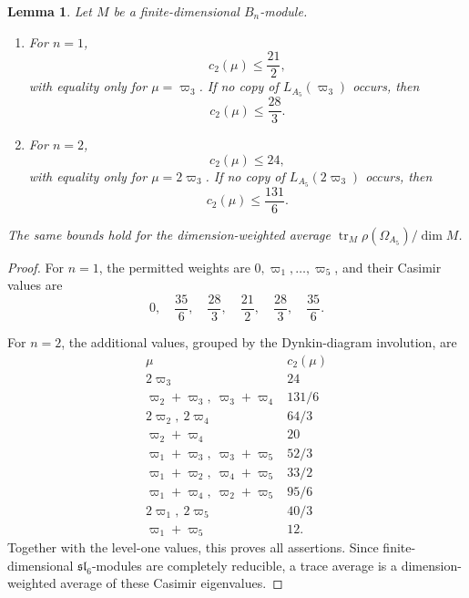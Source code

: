 \documentclass[11pt,reqno]{amsart}
\newtheorem{lemma}[theorem]{Lemma}
\theoremstyle{definition}
\theoremstyle{remark}
\begin{document}
\begin{lemma}\label{e6:lem:A5-Casimir-bounds}
Let $M$ be a finite-dimensional $B_n$-module.
\begin{enumerate}
  \item For $n=1$,
  \begin{equation*}
    c_2(\mu)\le\frac{21}{2},
  \end{equation*}
  with equality only for $\mu=\varpi_3$.  If no copy of
  $L_{A_5}(\varpi_3)$ occurs, then
  \begin{equation*}
    c_2(\mu)\le\frac{28}{3}.
  \end{equation*}

  \item For $n=2$,
  \begin{equation*}
    c_2(\mu)\le24,
  \end{equation*}
  with equality only for $\mu=2\varpi_3$.  If no copy of
  $L_{A_5}(2\varpi_3)$ occurs, then
  \begin{equation*}
    c_2(\mu)\le\frac{131}{6}.
  \end{equation*}
\end{enumerate}
The same bounds hold for the dimension-weighted average
$\operatorname{tr}_M\rho(\Omega_{A_5})/\dim M$.
\end{lemma}

\begin{proof}
For $n=1$, the permitted weights are
$0,\varpi_1,\ldots,\varpi_5$, and their Casimir values are
\[
  0,\quad
  \frac{35}{6},\quad
  \frac{28}{3},\quad
  \frac{21}{2},\quad
  \frac{28}{3},\quad
  \frac{35}{6}.
\]

For $n=2$, the additional values, grouped by the Dynkin-diagram involution, are
\begin{equation*}
\begin{array}{c|c}
\mu & c_2(\mu)\\ \hline
2\varpi_3 & 24\\
\varpi_2+\varpi_3,\ \varpi_3+\varpi_4 & 131/6\\
2\varpi_2,\ 2\varpi_4 & 64/3\\
\varpi_2+\varpi_4 & 20\\
\varpi_1+\varpi_3,\ \varpi_3+\varpi_5 & 52/3\\
\varpi_1+\varpi_2,\ \varpi_4+\varpi_5 & 33/2\\
\varpi_1+\varpi_4,\ \varpi_2+\varpi_5 & 95/6\\
2\varpi_1,\ 2\varpi_5 & 40/3\\
\varpi_1+\varpi_5 & 12.
\end{array}
\end{equation*}
Together with the level-one values, this proves all assertions.  Since
finite-dimensional $\mathfrak{sl}_6$-modules are completely reducible, a trace
average is a dimension-weighted average of these Casimir eigenvalues.
\end{proof}
\end{document}
